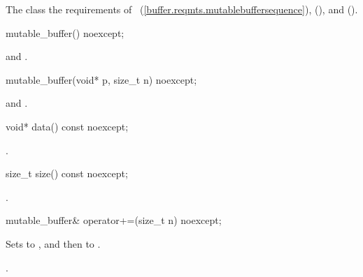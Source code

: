\pnum
The  class  the requirements of ~(\ref{buffer.reqmts.mutablebuffersequence}),  (), and  ().

%
\begin{itemdecl}
mutable_buffer() noexcept;
\end{itemdecl}

\begin{itemdescr}
\pnum
\postconditions {} and .
\end{itemdescr}

%
\begin{itemdecl}
mutable_buffer(void* p, size_t n) noexcept;
\end{itemdecl}

\begin{itemdescr}
\pnum
\postconditions {} and .
\end{itemdescr}

%
\begin{itemdecl}
void* data() const noexcept;
\end{itemdecl}

\begin{itemdescr}
\pnum
\returns {}.
\end{itemdescr}

%
\begin{itemdecl}
size_t size() const noexcept;
\end{itemdecl}

\begin{itemdescr}
\pnum
\returns {}.
\end{itemdescr}

%
\begin{itemdecl}
mutable_buffer& operator+=(size_t n) noexcept;
\end{itemdecl}

\begin{itemdescr}
\pnum
\effects Sets  to ,
and then  to .

\pnum
\returns {}.
\end{itemdescr}


